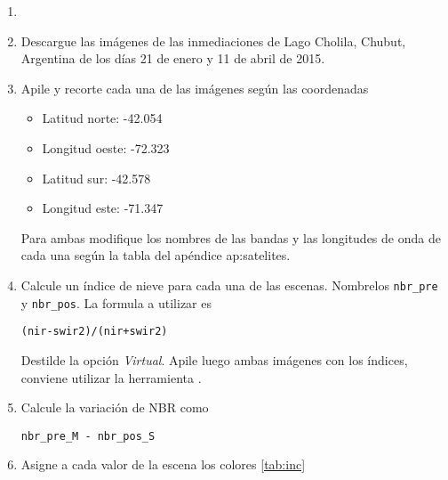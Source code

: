 \begin{enumerate}
\item \item Descargue las imágenes de las inmediaciones de Lago Cholila, Chubut, Argentina de los días 21 de enero y 11 de abril de 2015.

\item Apile y recorte cada una de las imágenes según las coordenadas

\begin{itemize}
    \item Latitud norte: -42.054
    \item Longitud oeste: -72.323
    \item Latitud sur: -42.578
    \item Longitud este: -71.347
\end{itemize}

Para ambas modifique los nombres de las bandas y las longitudes de onda de cada una según la tabla del apéndice ap:satelites.

\item Calcule un índice de nieve para cada una de las escenas. Nombrelos \texttt{nbr\_pre} y \texttt{nbr\_pos}. La formula a utilizar es

\begin{verbatim}
(nir-swir2)/(nir+swir2)
\end{verbatim}

Destilde la opción \emph{Virtual}. Apile luego ambas imágenes con los índices, conviene utilizar la herramienta .

\item Calcule la variación de NBR como

\begin{verbatim}
nbr_pre_M - nbr_pos_S
\end{verbatim}

\item Asigne a cada valor de la escena los colores \ref{tab:inc}


\end{enumerate}
